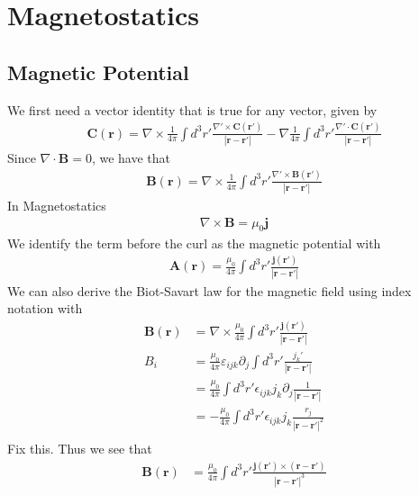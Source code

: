 \section{Magnetostatics}
\subsection{Magnetic Potential}
We first need a vector identity that is true for any vector, given by
\begin{align}
    \textbf{C}(\textbf{r}) = \nabla\times\frac{1}{4\pi}\int d^3r'\frac{\nabla'\times\textbf{C}(\textbf{r}')}{|\textbf{r}-\textbf{r}'|} - \nabla\frac{1}{4\pi}\int d^3r'\frac{\nabla'\cdot\textbf{C}(\textbf{r}')}{|\textbf{r}-\textbf{r}'|}
\end{align}
Since $\nabla\cdot\textbf{B} = 0$, we have that
\begin{align}
    \textbf{B}(\textbf{r}) = \nabla\times\frac{1}{4\pi}\int d^3r'\frac{\nabla'\times\textbf{B}(\textbf{r}')}{|\textbf{r}-\textbf{r}'|}
\end{align}
In Magnetostatics
\begin{align}
    \nabla\times\textbf{B} = \mu_0\textbf{j}
\end{align}
We identify the term before the curl as the magnetic potential with
\begin{align}
    \textbf{A}(\textbf{r}) = \frac{\mu_0}{4\pi}\int d^3r'\frac{\textbf{j}(\textbf{r}')}{|\textbf{r}-\textbf{r}'|}
\end{align}
We can also derive the Biot-Savart law for the magnetic field using index notation with
\begin{align}
        \textbf{B}(\textbf{r}) &= \nabla\times\frac{\mu_0}{4\pi}\int d^3r'\frac{\textbf{j}(\textbf{r}')}{|\textbf{r}-\textbf{r}'|}\\
        B_i &=\frac{\mu_0}{4\pi} \varepsilon_{ijk}\partial_j\int d^3r'\frac{j_k'}{|\textbf{r}-\textbf{r}'|}\\
        &= \frac{\mu_0}{4\pi} \int d^3r' \epsilon_{ijk}j_k \partial_j \frac{1}{|\textbf{r}-\textbf{r}'|}\\
        &=-\frac{\mu_0}{4\pi} \int d^3r' \epsilon_{ijk}j_k \frac{r_j}{|\textbf{r}-\textbf{r}'|^2}\\
\end{align}
Fix this. Thus we see that
\begin{align}
    \textbf{B}(\textbf{r}) &= \frac{\mu_0}{4\pi} \int d^3r'\frac{\textbf{j}(\textbf{r}')\times(\textbf{r}-\textbf{r}')}{|\textbf{r}-\textbf{r}'|^3}
\end{align}


